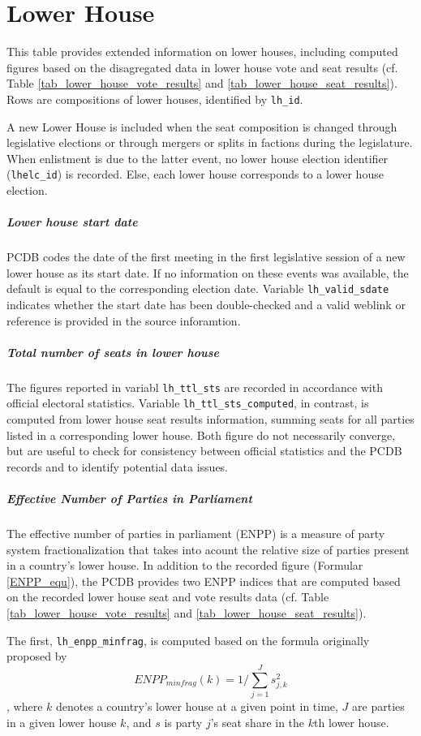 \section{Lower House}\label{sec_view_lower_house}
This table provides extended information on lower houses, including computed figures based on the disagregated data in lower house vote and seat results (cf. Table \ref{tab_lower_house_vote_results} and  \ref{tab_lower_house_seat_results}). 
Rows are compositions of lower houses, identified by \texttt{\footnotesize lh\_id}. 

A new Lower House is included when the seat composition is changed through legislative elections or through mergers or splits in factions during the legislature. When enlistment is due to the latter event, no lower house 
election identifier (\texttt{\footnotesize lhelc\_id}) is recorded. Else, each lower house corresponds to a lower house election.


\subparagraph{Lower house start date}
PCDB codes the date of the first meeting in the first legislative session of a new lower house as its start date. If no information on these events was available, the default is equal to the corresponding election date. Variable \texttt{\footnotesize lh\_valid\_sdate} indicates whether the start date has been double-checked and a valid weblink or reference is provided in the source inforamtion.

\subparagraph{Total number of seats in lower house} The figures reported in variabl \texttt{\footnotesize lh\_ttl\_sts} are recorded in accordance with official electoral statistics. 
Variable \texttt{\footnotesize lh\_ttl\_sts\_computed}, in contrast, is computed from lower house seat results information, summing seats for all parties listed in a corresponding lower house.
Both figure do not necessarily converge, but are useful to check for consistency between official statistics and the PCDB records and to identify potential data issues.

\subparagraph{Effective Number of Parties in Parliament}
The effective number of parties in parliament (ENPP) is a measure of party system fractionalization that takes into acount the relative size of parties present in a country's lower house. In addition to the recorded figure (Formular \ref{ENPP_equ}), the PCDB provides two ENPP indices that are computed based on the recorded lower house seat and vote results data (cf. Table \ref{tab_lower_house_vote_results} and  \ref{tab_lower_house_seat_results}).

The first, \texttt{\footnotesize lh\_enpp\_minfrag}, is computed based on the formula originally proposed by \citet{Laakso&Taagepera1979}
\begin{equation}\label{ENPP_equ_minfrag}
ENPP_{minfrag}(k) = 1/\sum\limits_{j=1}^{J}s_{j,k}^{2}
\end{equation}
, where $k$ denotes a country's lower house at a given point in time, $J$ are parties in a given lower house $k$, and $s$ is party $j$'s seat share in the $k$th lower house. 

